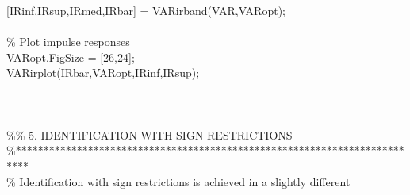 \hspace{1mm}\hspace{5mm} \hspace{5mm} [IRinf,IRsup,IRmed,IRbar] = VARirband(VAR,VARopt); \\ 
\hspace{1mm}\hspace{5mm} \hspace{5mm}  \\ 
\hspace{1mm}\hspace{5mm} \hspace{5mm} \textcolor{matlabgreen}{\% Plot impulse responses }\\ 
\hspace{1mm}\hspace{5mm} \hspace{5mm} VARopt.FigSize = [26,24]; \\ 
\hspace{1mm}\hspace{5mm} \hspace{5mm} VARirplot(IRbar,VARopt,IRinf,IRsup); \\ 
\hspace{1mm}\hspace{5mm} \hspace{5mm}  \\ 
\hspace{1mm}\hspace{5mm} \hspace{5mm}  \\ 
\hspace{1mm}\hspace{5mm} \hspace{5mm}  \\ 
\hspace{1mm}\hspace{5mm} \hspace{5mm} \textcolor{matlabgreen}{\%}\textcolor{matlabgreen}{\% 5. IDENTIFICATION WITH SIGN RESTRICTIONS }\\ 
\hspace{1mm}\hspace{5mm} \hspace{5mm} \textcolor{matlabgreen}{\%**************************************************************************  }\\ 
\hspace{1mm}\hspace{5mm} \hspace{5mm} \textcolor{matlabgreen}{\% Identification with sign restrictions is achieved in a slightly different  }\\ 
